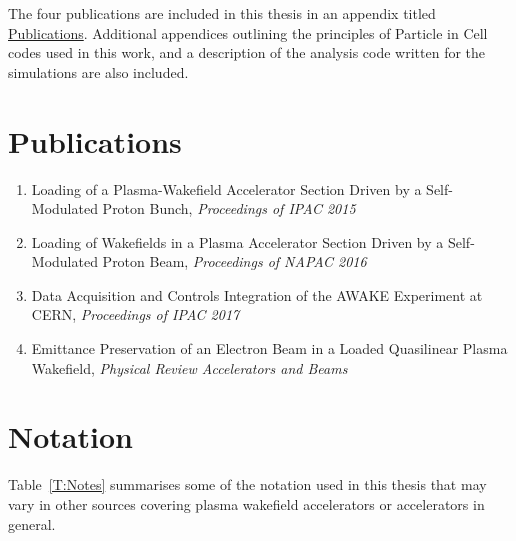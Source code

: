 The four publications are included in this thesis in an appendix titled \hyperref[A:Pub]{Publications}.
Additional appendices outlining the principles of Particle in Cell codes used in this work, and a description of the analysis code written for the simulations are also included.

\section*{Publications}

\begin{enumerate}[I]
    \item Loading of a Plasma-Wakefield Accelerator Section Driven by a Self-Modulated Proton Bunch, \textit{Proceedings of IPAC 2015} \cite{berglyd_olsen:2015}
    \item Loading of Wakefields in a Plasma Accelerator Section Driven by a Self-Modulated Proton Beam, \textit{Proceedings of NAPAC 2016} \cite{berglyd_olsen:2016}
    \item Data Acquisition and Controls Integration of the AWAKE Experiment at CERN, \textit{Proceedings of IPAC 2017} \cite{berglyd_olsen:2017}
    \item Emittance Preservation of an Electron Beam in a Loaded Quasilinear Plasma Wakefield, \textit{Physical Review Accelerators and Beams} \cite{berglyd_olsen:2018}
\end{enumerate}

\section*{Notation}

Table~\ref{T:Notes} summarises some of the notation used in this thesis that may vary in other sources covering plasma wakefield accelerators or accelerators in general.

